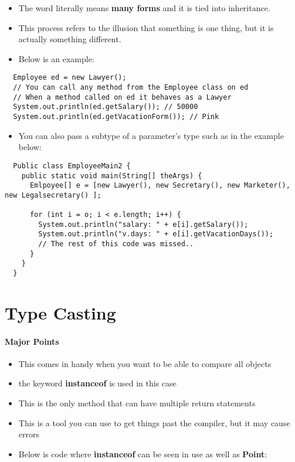 \documentclass{article}
\begin{document}
\begin{itemize}
  \item The word literally means \textbf{many forms} and it is tied into inheritance.
  \item This process refers to the illusion that something is one thing, but it
  is actually something different.
  \item Below is an example: 
\end{itemize}

\begin{lstlisting}
  Employee ed = new Lawyer();
  // You can call any method from the Employee class on ed
  // When a method called on ed it behaves as a Lawyer
  System.out.println(ed.getSalary()); // 50000
  System.out.println(ed.getVacationForm()); // Pink
\end{lstlisting}

\begin{itemize}
  \item You can also pass a subtype of a parameter's type such as in the example
  below:
\end{itemize}

\begin{lstlisting}
  Public class EmployeeMain2 {
    public static void main(String[] theArgs) {
      Emlpoyee[] e = [new Lawyer(), new Secretary(), new Marketer(), new Legalsecretary() ];

      for (int i = o; i < e.length; i++) {
        System.out.println("salary: " + e[i].getSalary());
        System.out.println("v.days: " + e[i].getVacationDays());
        // The rest of this code was missed.. 
      }
    }
  }
\end{lstlisting}

\section{Type Casting}
\paragraph{Major Points}

\begin{itemize}
  \item This comes in handy when you want to be able to compare all objects 
  \item the keyword \textbf{instanceof} is used in this case 
  \item This is the only method that can have multiple return statements
  \item This is a tool you can use to get things past the compiler, but it may
  cause errors
  \item Below is code where \textbf{instanceof} can be seen in use as well as
  \textbf{Point}:
\end{itemize}
\end{document}
